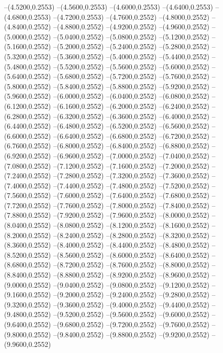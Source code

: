 {	--(4.5200,0.2553)
	--(4.5600,0.2553)
	--(4.6000,0.2553)
	--(4.6400,0.2553)
	--(4.6800,0.2553)
	--(4.7200,0.2553)
	--(4.7600,0.2552)
	--(4.8000,0.2552)
	--(4.8400,0.2552)
	--(4.8800,0.2552)
	--(4.9200,0.2552)
	--(4.9600,0.2552)
	--(5.0000,0.2552)
	--(5.0400,0.2552)
	--(5.0800,0.2552)
	--(5.1200,0.2552)
	--(5.1600,0.2552)
	--(5.2000,0.2552)
	--(5.2400,0.2552)
	--(5.2800,0.2552)
	--(5.3200,0.2552)
	--(5.3600,0.2552)
	--(5.4000,0.2552)
	--(5.4400,0.2552)
	--(5.4800,0.2552)
	--(5.5200,0.2552)
	--(5.5600,0.2552)
	--(5.6000,0.2552)
	--(5.6400,0.2552)
	--(5.6800,0.2552)
	--(5.7200,0.2552)
	--(5.7600,0.2552)
	--(5.8000,0.2552)
	--(5.8400,0.2552)
	--(5.8800,0.2552)
	--(5.9200,0.2552)
	--(5.9600,0.2552)
	--(6.0000,0.2552)
	--(6.0400,0.2552)
	--(6.0800,0.2552)
	--(6.1200,0.2552)
	--(6.1600,0.2552)
	--(6.2000,0.2552)
	--(6.2400,0.2552)
	--(6.2800,0.2552)
	--(6.3200,0.2552)
	--(6.3600,0.2552)
	--(6.4000,0.2552)
	--(6.4400,0.2552)
	--(6.4800,0.2552)
	--(6.5200,0.2552)
	--(6.5600,0.2552)
	--(6.6000,0.2552)
	--(6.6400,0.2552)
	--(6.6800,0.2552)
	--(6.7200,0.2552)
	--(6.7600,0.2552)
	--(6.8000,0.2552)
	--(6.8400,0.2552)
	--(6.8800,0.2552)
	--(6.9200,0.2552)
	--(6.9600,0.2552)
	--(7.0000,0.2552)
	--(7.0400,0.2552)
	--(7.0800,0.2552)
	--(7.1200,0.2552)
	--(7.1600,0.2552)
	--(7.2000,0.2552)
	--(7.2400,0.2552)
	--(7.2800,0.2552)
	--(7.3200,0.2552)
	--(7.3600,0.2552)
	--(7.4000,0.2552)
	--(7.4400,0.2552)
	--(7.4800,0.2552)
	--(7.5200,0.2552)
	--(7.5600,0.2552)
	--(7.6000,0.2552)
	--(7.6400,0.2552)
	--(7.6800,0.2552)
	--(7.7200,0.2552)
	--(7.7600,0.2552)
	--(7.8000,0.2552)
	--(7.8400,0.2552)
	--(7.8800,0.2552)
	--(7.9200,0.2552)
	--(7.9600,0.2552)
	--(8.0000,0.2552)
	--(8.0400,0.2552)
	--(8.0800,0.2552)
	--(8.1200,0.2552)
	--(8.1600,0.2552)
	--(8.2000,0.2552)
	--(8.2400,0.2552)
	--(8.2800,0.2552)
	--(8.3200,0.2552)
	--(8.3600,0.2552)
	--(8.4000,0.2552)
	--(8.4400,0.2552)
	--(8.4800,0.2552)
	--(8.5200,0.2552)
	--(8.5600,0.2552)
	--(8.6000,0.2552)
	--(8.6400,0.2552)
	--(8.6800,0.2552)
	--(8.7200,0.2552)
	--(8.7600,0.2552)
	--(8.8000,0.2552)
	--(8.8400,0.2552)
	--(8.8800,0.2552)
	--(8.9200,0.2552)
	--(8.9600,0.2552)
	--(9.0000,0.2552)
	--(9.0400,0.2552)
	--(9.0800,0.2552)
	--(9.1200,0.2552)
	--(9.1600,0.2552)
	--(9.2000,0.2552)
	--(9.2400,0.2552)
	--(9.2800,0.2552)
	--(9.3200,0.2552)
	--(9.3600,0.2552)
	--(9.4000,0.2552)
	--(9.4400,0.2552)
	--(9.4800,0.2552)
	--(9.5200,0.2552)
	--(9.5600,0.2552)
	--(9.6000,0.2552)
	--(9.6400,0.2552)
	--(9.6800,0.2552)
	--(9.7200,0.2552)
	--(9.7600,0.2552)
	--(9.8000,0.2552)
	--(9.8400,0.2552)
	--(9.8800,0.2552)
	--(9.9200,0.2552)
	--(9.9600,0.2552)
}
